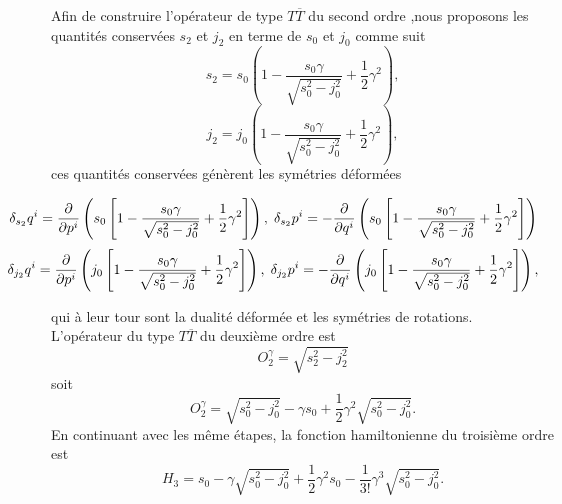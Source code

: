 \documentclass[12pt,a4paper, openany]{report}
\begin{document}
	Afin de construire l'opérateur de type $T{\overline{T}}$ du second ordre ,nous proposons les quantités conservées $s_2$ et $j_2$ en terme de $s_0$ et $j_0$ comme suit 
	\begin{equation}
		s_2=s_0\left(1-\frac{s_0\gamma}{\sqrt{s^2_0-j^2_0}}+\frac{1}{2}\gamma^{2}\right),
	\end{equation}
	\begin{equation}
		j_2=j_0\left(1-\frac{s_0\gamma}{\sqrt{s^2_0-j^2_0}}+\frac{1}{2}\gamma^{2}\right),	 
	\end{equation}
	ces quantités conservées génèrent les symétries déformées
	\begin{center}
		\begin{equation}
			\hspace{-1.5cm} \delta_{s_2}q^i=\frac{\partial}{\partial p^i}\left(s_0\left[1-\frac{s_0\gamma}{\sqrt{s^2_0-j^2_0}}+\frac{1}{2}\gamma^{2}\right]\right), \hspace{0.1cm}\delta_{s_2}p^i=-\frac{\partial}{\partial q^i}\left(s_0\left[1-\frac{s_0\gamma}{\sqrt{s^2_0-j^2_0}}+\frac{1}{2}\gamma^{2}\right]\right)
		\end{equation}
		\begin{equation}
			\hspace{-1.5cm}\delta_{j_2}q^i=\frac{\partial}{\partial p^i}\left(j_0\left[1-\frac{s_0\gamma}{\sqrt{s^2_0-j^2_0}}+\frac{1}{2}\gamma^{2}\right]\right),\hspace{0.1cm}\delta_{j_2}p^i=-\frac{\partial}{\partial q^i}\left(j_0\left[1-\frac{s_0\gamma}{\sqrt{s^2_0-j^2_0}}+\frac{1}{2}\gamma^{2}\right]\right),
		\end{equation}
	\end{center} qui à leur tour sont la dualité déformée et les symétries de rotations. \\ L'opérateur du type $T\overline{T}$ du deuxième ordre est 
	\begin{equation}
		O^{\gamma}_2=\sqrt{s^2_2-j^2_2}
	\end{equation}
	soit 
	\begin{equation}
		O^{\gamma}_2=\sqrt{s^2_0-j^2_0}-\gamma s_0 +\frac{1}{2}\gamma^{2}\sqrt{s^2_0-j^2_0}.	
	\end{equation}
	En continuant avec les m\^{e}me étapes, la fonction hamiltonienne du troisième ordre est 
	\begin{equation}
		H_3=s_0-\gamma\sqrt{s^2_0-j^2_0}+\frac{1}{2}\gamma^{2}s_0-\frac{1}{3!}\gamma^{3}\sqrt{s^2_0-j^2_0} .
	\end{equation}
	
\end{document}
